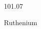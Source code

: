 \documentclass[12pt]{article}
\begin{document}
\hfill{}
\vfill
\begin{center}
  {\fontsize{50}{60}
  }

  101.07

Ruthenium
\end{center}
\vfill
\end{document}
